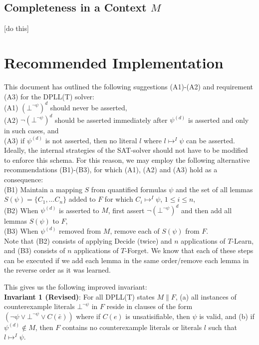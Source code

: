 \documentclass{llncs}
\begin{document}
\subsection{Completeness in a Context $M$}

[do this]

\section{Recommended Implementation}
\label{sec:implementation}

This document has outlined the following suggestions (A1)-(A2) and requirement (A3) for the DPLL(T) solver: \\

\noindent (A1) $(\bot^{\neg \psi})^d$ should never be asserted, \\
(A2) $\neg (\bot^{\neg \psi})^d$ should be asserted immediately after $\psi^{(d)}$ is asserted and only in such cases, and \\
(A3) if $\psi^{(d)}$ is not asserted, then no literal $l$ where $l \mapsto^I \psi$ can be asserted. \\

Ideally, the internal strategies of the SAT-solver should not have to be modified to enforce this schema.
For this reason, we may employ the following alternative recommendations (B1)-(B3), for which (A1), (A2) and (A3) hold as a consequence: \\

\noindent (B1) Maintain a mapping $S$ from quantified formulas $\psi$ and the set of all lemmas $S(\psi) = \{ C_1, \ldots C_n \}$ added to $F$ for which $C_i \mapsto^I \psi$, $1 \leq i \leq n$, \\
(B2) When $\psi^{(d)}$ is asserted to $M$, first assert $\neg (\bot^{\neg \psi})^d$ and then add all lemmas $S(\psi)$ to $F$, \\
(B3) When $\psi^{(d)}$ removed from $M$, remove each of $S(\psi)$ from $F$. \\

Note that (B2) consists of applying Decide (twice) and $n$ applications of $T$-Learn, and (B3) consists of $n$ applications of $T$-Forget.
We know that each of these steps can be executed if we add each lemma in the same order/remove each lemma in the reverse order as it was learned.

This gives us the following improved invariant: \\

{\bf Invariant 1 (Revised)}:
For all DPLL(T) states $M \parallel F$,
(a) all instances of counterexample literals $\bot^{\neg \psi}$ in $F$ reside in clauses of the form $( \neg \psi \vee \bot^{\neg \psi} \vee C(\bar{e}) )$ where if $C(e)$ is unsatisifiable, then $\psi$ is valid, and
(b) if $\psi^{(d)} \not\in M$, then $F$ contains no counterexample literals or literals $l$ such that $l \mapsto^I \psi$. \\
\end{document}
